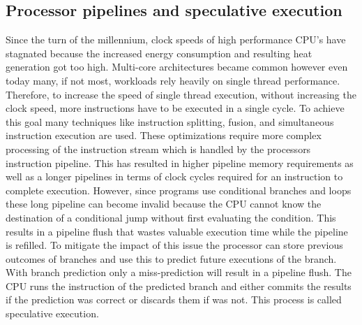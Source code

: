\documentclass[conference,compsoc,final,a4paper]{IEEEtran}
\begin{document}
\subsection{Processor pipelines and speculative execution}
Since the turn of the millennium, clock speeds of high performance CPU's have stagnated because the increased energy consumption and resulting heat generation got
too high. \cite{fog2012microarchitecture} Multi-core architectures became common however even today many, if not most,
workloads rely heavily on single thread performance. Therefore, to increase the speed of single thread execution, without increasing the clock speed,
more instructions have to be executed in a single cycle. To achieve this goal many techniques like instruction splitting, fusion,
and simultaneous instruction execution are used. \cite{fog2012microarchitecture} These optimizations require more complex processing of the instruction stream which
is handled by the processors instruction pipeline. This has resulted in higher pipeline memory requirements as well as a longer pipelines in terms of clock cycles
required for an instruction to complete execution. However, since programs use conditional branches and loops these long pipeline can become invalid because the CPU
cannot know the destination of a conditional jump without first evaluating the condition. This results in a pipeline flush that wastes valuable execution time while
the pipeline is refilled. To mitigate the impact of this issue the processor can store previous outcomes of branches and use this to predict future executions of the
branch. With branch prediction only a miss-prediction will result in a pipeline flush. The CPU runs the instruction of the predicted branch and either commits
the results if the prediction was correct or discards them if was not.
This process is called speculative execution. \cite{kocher2018spectre}
\end{document}
